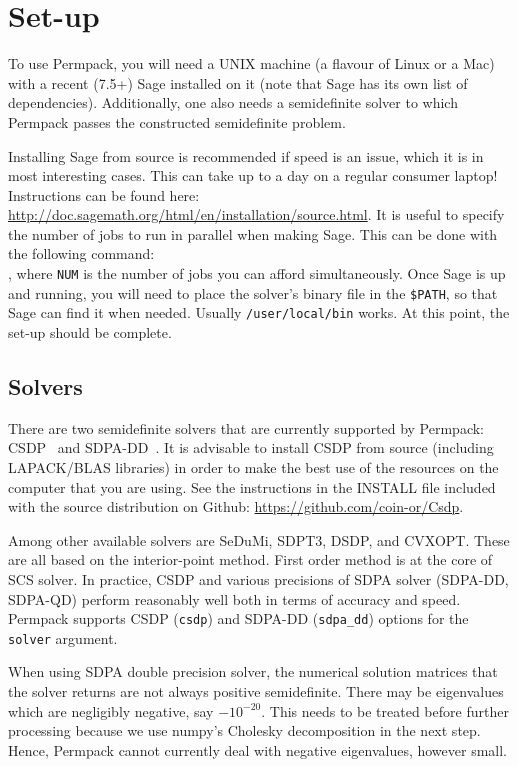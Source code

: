 \documentclass[12pt, a4paper, twoside]{report}
\begin{document}
\section{Set-up}
\label{sec:permpack-setup}

To use Permpack, you will need a UNIX machine (a flavour of Linux or a Mac) with a recent (7.5+) Sage installed on it (note that Sage has its own list of dependencies). Additionally, one also needs a semidefinite solver to which Permpack passes the constructed semidefinite problem.

Installing Sage from source is recommended if speed is an issue, which it is in most interesting cases. This can take up to a day on a regular consumer laptop! Instructions can be found here: \url{http://doc.sagemath.org/html/en/installation/source.html}. It is useful to specify the number of jobs to run in parallel when making Sage. This can be done with the following command:\\ , where \texttt{NUM} is the number of jobs you can afford simultaneously. Once Sage is up and running, you will need to place the solver's binary file in the \texttt{\$PATH}, so that Sage can find it when needed. Usually \texttt{/user/local/bin} works. At this point, the set-up should be complete.


\subsection{Solvers}
\label{sec:permpack-solvers}

There are two semidefinite solvers that are currently supported by Permpack: CSDP~\cite{csdp} and SDPA-DD~\cite{sdpa}. It is advisable to install CSDP from source (including LAPACK/BLAS libraries) in order to make the best use of the resources on the computer that you are using. See the instructions in the INSTALL file included with the source distribution on Github: \url{https://github.com/coin-or/Csdp}.

Among other available solvers are SeDuMi, SDPT3, DSDP, and CVXOPT. These are all based on the interior-point method. First order method is at the core of SCS solver. In practice, CSDP and various precisions of SDPA solver (SDPA-DD, SDPA-QD) perform reasonably well both in terms of accuracy and speed. Permpack supports CSDP (\texttt{csdp}) and SDPA-DD (\texttt{sdpa\_dd}) options for the \texttt{solver} argument.

\begin{note}
When using SDPA double precision solver, the numerical solution matrices that the solver returns are not always positive semidefinite. There may be eigenvalues which are negligibly negative, say $-10^{-20}$. This needs to be treated before further processing because we use numpy's Cholesky decomposition in the next step. Hence, Permpack cannot currently deal with negative eigenvalues, however small.
\end{note}
\end{document}

